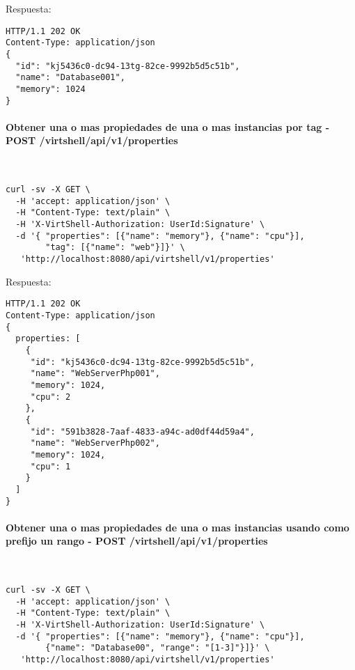\vspace{1cm}
Respuesta:
\vspace{1cm}

\begin{lstlisting}[style=json]
HTTP/1.1 202 OK
Content-Type: application/json
{
  "id": "kj5436c0-dc94-13tg-82ce-9992b5d5c51b",
  "name": "Database001",
  "memory": 1024
}
\end{lstlisting}

\paragraph{Obtener una o mas propiedades de una o mas instancias por tag - POST /virtshell/api/v1/properties} ~\\

\begin{lstlisting}[style=json]
curl -sv -X GET \
  -H 'accept: application/json' \
  -H "Content-Type: text/plain" \
  -H 'X-VirtShell-Authorization: UserId:Signature' \
  -d '{ "properties": [{"name": "memory"}, {"name": "cpu"}],
        "tag": [{"name": "web"}]}' \
   'http://localhost:8080/api/virtshell/v1/properties'
\end{lstlisting}

\vspace{1cm}
Respuesta:
\vspace{1cm}

\begin{lstlisting}[style=json]
HTTP/1.1 202 OK
Content-Type: application/json
{
  properties: [
    {
     "id": "kj5436c0-dc94-13tg-82ce-9992b5d5c51b",
     "name": "WebServerPhp001",
     "memory": 1024,
     "cpu": 2
    },
    {
     "id": "591b3828-7aaf-4833-a94c-ad0df44d59a4",
     "name": "WebServerPhp002",
     "memory": 1024,
     "cpu": 1  
    }
  ]
}
\end{lstlisting}

\paragraph{Obtener una o mas propiedades de una o mas instancias usando como prefijo un rango - POST /virtshell/api/v1/properties} ~\\

\begin{lstlisting}[style=json]
curl -sv -X GET \
  -H 'accept: application/json' \
  -H "Content-Type: text/plain" \
  -H 'X-VirtShell-Authorization: UserId:Signature' \
  -d '{ "properties": [{"name": "memory"}, {"name": "cpu"}],
        {"name": "Database00", "range": "[1-3]"}]}' \
   'http://localhost:8080/api/virtshell/v1/properties'
\end{lstlisting}

